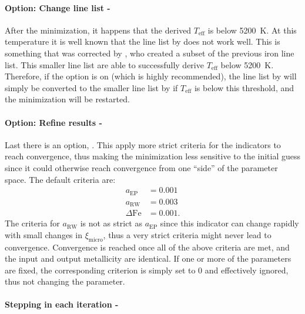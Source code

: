 \paragraph{Option: Change line list - }

After the minimization, it happens that the derived $T_\mathrm{eff}$ is below \SI{5200}{K}. At this
temperature it is well known that the line list by \citet{Sousa2008a} does not work well. This is
something that was corrected by \citet{Tsantaki2013}, who created a subset of the previous iron line
list. This smaller line list are able to successfully derive $T_\mathrm{eff}$ below \SI{5200}{K}.
Therefore, if the option  is on (which is highly recommended), the line list by
\citet{Sousa2008a} will simply be converted to the smaller line list by \citet{Tsantaki2013} if
$T_\mathrm{eff}$ is below this threshold, and the minimization will be restarted.

\paragraph{Option: Refine results - }

Last there is an option, . This apply more strict criteria for the indicators to reach
convergence, thus making the minimization less sensitive to the initial guess since it could
otherwise reach convergence from one ``side'' of the parameter space. The default criteria are:
\begin{align*}
  a_\mathrm{EP}     &= 0.001\\
  a_\mathrm{RW}     &= 0.003\\
  \Delta\mathrm{Fe} &= 0.001.
\end{align*}
The criteria for $a_\mathrm{RW}$ is not as strict as $a_\mathrm{EP}$ since this indicator can change
rapidly with small changes in $\xi_\mathrm{micro}$, thus a very strict criteria might never lead to
convergence. Convergence is reached once all of the above criteria are met, and the input and output
metallicity are identical. If one or more of the parameters are fixed, the corresponding criterion
is simply set to 0 and effectively ignored, thus not changing the parameter.

\paragraph{Stepping in each iteration - }

